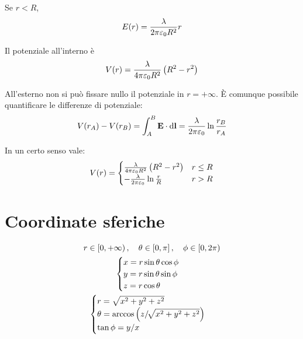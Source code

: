 Se $r < R$,
\begin{equation}
    E(r) = \frac{\lambda}{2\pi\varepsilon_0 R^2} r
\end{equation}

Il potenziale all'interno è
\begin{equation}
    V(r) = \frac{\lambda}{4\pi\varepsilon_0 R^2} \left( R^2 - r^2 \right)
\end{equation}

All'esterno non si può fissare nullo il potenziale in $r = +\infty$.
È comunque possibile quantificare le differenze di potenziale:
\begin{equation}
    V(r_A) - V(r_B) = \int_A^B \mathbf{E} \cdot \mathrm{d} \mathbf{l} = \frac{\lambda}{2\pi\varepsilon_0} \ln\frac{r_B}{r_A}
\end{equation}

In un certo senso vale:
\begin{equation}
    V(r) = \begin{cases}
        \frac{\lambda}{4\pi\varepsilon_0 R^2} \left( R^2 - r^2 \right) & r \le R \\
        - \frac{\lambda}{2\pi\varepsilon_0} \ln\frac{r}{R} & r > R
    \end{cases}
\end{equation}

\section{Coordinate sferiche}

\begin{subequations}
\begin{gather}
    r \in \left[0, +\infty\right), \quad \theta \in \left[0, \pi\right], \quad \phi \in \left[0, 2\pi\right) \\
    \begin{cases}
        x = r \sin \theta \cos \phi \\
        y = r \sin \theta \sin \phi \\
        z = r \cos \theta
    \end{cases} \\
    \begin{cases}
        r = \sqrt{x^2 + y^2 + z^2} \\
        \theta = \arccos\left( z/\!\sqrt{x^2 + y^2 + z^2} \right) \\
        \tan \phi = y/x
    \end{cases}
\end{gather}
\end{subequations}

